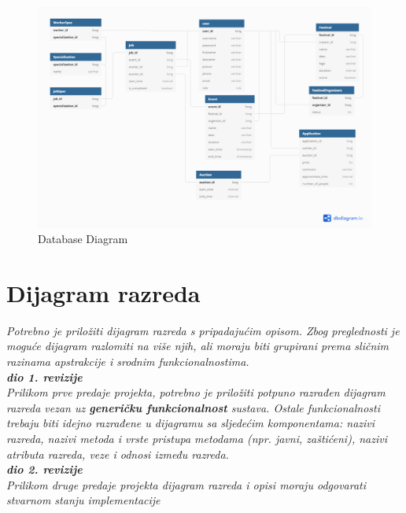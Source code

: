 				\begin{figure}[H]
					\includegraphics[width=\linewidth]{slike/db_normal_diag.png}
					\centering
					\caption{Database Diagram}
					\label{fig:normal_diag}
				\end{figure}
			
			\eject
			
			
		\section{Dijagram razreda}
		
			\textit{Potrebno je priložiti dijagram razreda s pripadajućim opisom. Zbog preglednosti je moguće dijagram razlomiti na više njih, ali moraju biti grupirani prema sličnim razinama apstrakcije i srodnim funkcionalnostima.}\\
			
			\textbf{\textit{dio 1. revizije}}\\
			
			\textit{Prilikom prve predaje projekta, potrebno je priložiti potpuno razrađen dijagram razreda vezan uz \textbf{generičku funkcionalnost} sustava. Ostale funkcionalnosti trebaju biti idejno razrađene u dijagramu sa sljedećim komponentama: nazivi razreda, nazivi metoda i vrste pristupa metodama (npr. javni, zaštićeni), nazivi atributa razreda, veze i odnosi između razreda.}\\
			
			\textbf{\textit{dio 2. revizije}}\\			
			
			\textit{Prilikom druge predaje projekta dijagram razreda i opisi moraju odgovarati stvarnom stanju implementacije}
			
